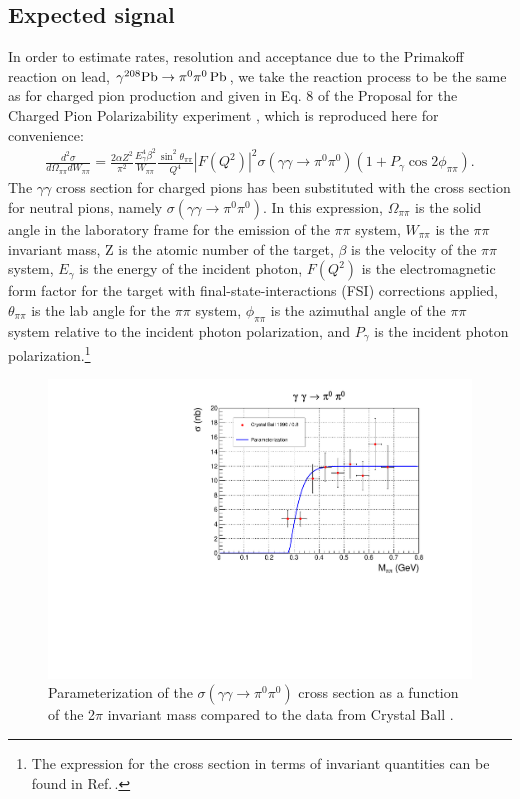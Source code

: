 \subsection{Expected signal}
In order to estimate rates, resolution and acceptance due to the
Primakoff reaction on lead, $\gamma ^{208}\rm{Pb}\rightarrow \pi^0
\pi^0\, \rm{Pb}$, we take the reaction process to be the same as for
charged pion production and given in Eq. 8 of the Proposal for the
Charged Pion Polarizability experiment \cite{CPPexp}, which is
reproduced here for convenience:
\begin{eqnarray}
\frac{d^2\sigma}{d\Omega_{\pi\pi}dW_{\pi\pi}} = \frac{2\alpha Z^2}{\pi^2} \frac{E^4_\gamma \beta^2}{W_{\pi\pi}} \frac{\sin^2\theta_{\pi\pi}}{Q^4} |F(Q^2)|^2 \sigma(\gamma\gamma\rightarrow\pi^0\pi^0) (1+P_\gamma \cos{2\phi_{\pi\pi}}).   \label{eq:PrimakoffSignal}
\end{eqnarray}
The $\gamma\gamma$ cross section for charged pions has been
substituted with the cross section for neutral pions, namely
$\sigma(\gamma\gamma\rightarrow\pi^0\pi^0)$. In this expression,
$\Omega_{\pi\pi}$ is the solid angle in the laboratory frame for the
emission of the $\pi\pi$ system, $W_{\pi\pi}$ is the $\pi\pi$
invariant mass, Z is the atomic number of the target, $\beta$ is the
velocity of the $\pi\pi$ system, $E_\gamma$ is the energy of the
incident photon, $F(Q^2)$ is the electromagnetic form factor for the
target with final-state-interactions (FSI) corrections applied,
$\theta_{\pi\pi}$ is the lab angle for the $\pi\pi$ system,
$\phi_{\pi\pi}$ is the azimuthal angle of the $\pi\pi$ system relative
to the incident photon polarization, and $P_\gamma$ is the incident
photon polarization.\footnote{The expression for the cross section in
  terms of invariant quantities can be found in
  Ref.\,\cite{hdnote3186}.}
\begin{figure}[tph]
\centering
\includegraphics[page=1,width=4.75in]{figures/sigma_2pi0_figs.pdf}
\caption{Parameterization of the $\sigma(\gamma\gamma\rightarrow \pi^0\pi^0)$ cross section as a function
of the 2$\pi$ invariant mass compared to the data from Crystal Ball \cite{Marsiske:1990hx}.
\label{fig:sigma_2pi0_figs_1}}
\end{figure}

